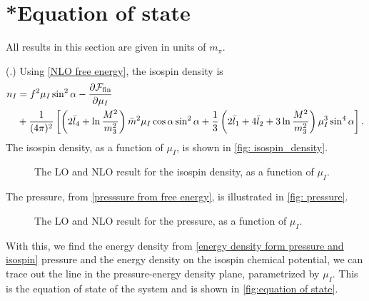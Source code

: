 \section{*Equation of state}
\label{section: equation of state}
 

All results in this section are given in units of $m_\pi$.

(\autocite{adhikariTwoflavorChiralPerturbation2019,andersenIntroductionStatisticalMechanics2012,peskinIntroductionQuantumField1995}.)
Using \autoref{NLO free energy}, the isospin density is
%
\begin{align}
    \nonumber
    n_I & = 
    f^2 \mu_I \sin^2 \alpha
    - \pdv{\mathcal{F}_\mathrm{fin}}{\mu_I} \\
    & + \frac{1}{(4 \pi)^2}
    \left[
            \left(
                2\bar l_4+\ln\frac{M^2}{m_3^2}
            \right) 
            \bar m^2 \mu_I \cos\alpha \sin^2 \alpha
            +\frac{1}{3}
            \left(
                2\bar l_1 + 4 \bar l_2 + 3\ln\frac{M^2}{m_3^2}
            \right)
            \mu_I^3 \sin^4 \alpha
    \right].
\end{align}
%
The isospin density, as a function of $\mu_I$, is shown in \autoref{fig: isospin_density}.
\begin{figure}[h]
    \centering
    \vspace{-0.2cm}
    \caption{The LO and NLO result for the isospin density, as a function of $\mu_I$.}
    \label{fig: isospin_density}
\end{figure}

The pressure, from \autoref{presssure from free energy}, is  illustrated in \autoref{fig: pressure}.

\begin{figure}[h]
    \centering
    \vspace{-0.2cm}
    \caption{The LO and NLO result for the pressure, as a function of $\mu_I$.}
    \label{fig: pressure}
\end{figure}


With this, we find the energy density from \autoref{energy density form pressure and isospin}
 pressure and the energy density on the isospin chemical potential, we can trace out the line in the pressure-energy density plane, parametrized by $\mu_I$.
This is the equation of state of the system and is shown in \autoref{fig:equation of state}.

